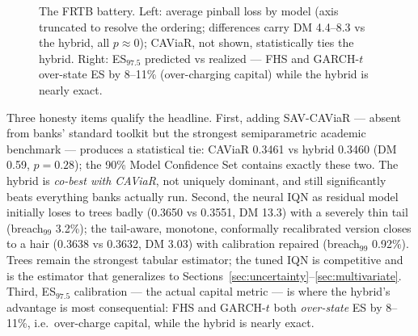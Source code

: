 \documentclass[11pt]{article}
\theoremstyle{remark}
\begin{document}
\begin{figure}[t]
\centering
{}\hfill
{}
\caption{The FRTB battery. Left: average pinball loss by model (axis
truncated to resolve the ordering; differences carry DM 4.4--8.3 vs the
hybrid, all $p \approx 0$); CAViaR, not shown, statistically ties the
hybrid. Right: ES$_{97.5}$ predicted vs realized --- FHS and GARCH-$t$
over-state ES by 8--11\% (over-charging capital) while the hybrid is
nearly exact.}
\label{fig:frtb}
\end{figure}

Three honesty items qualify the headline. First, adding SAV-CAViaR ---
absent from banks' standard toolkit but the strongest semiparametric
academic benchmark --- produces a statistical tie: CAViaR 0.3461 vs
hybrid 0.3460 (DM 0.59, $p=0.28$); the 90\% Model Confidence Set
contains exactly these two. The hybrid is \emph{co-best with CAViaR},
not uniquely dominant, and still significantly beats everything banks
actually run. Second, the neural IQN as residual model initially loses
to trees badly (0.3650 vs 0.3551, DM 13.3) with a severely thin tail
(breach$_{99}$ 3.2\%); the tail-aware, monotone, conformally
recalibrated version closes to a hair (0.3638 vs 0.3632, DM 3.03) with
calibration repaired (breach$_{99}$ 0.92\%). Trees remain the strongest
tabular estimator; the tuned IQN is competitive and is the estimator
that generalizes to Sections~\ref{sec:uncertainty}--\ref{sec:multivariate}.
Third, ES$_{97.5}$ calibration --- the actual capital metric --- is
where the hybrid's advantage is most consequential: FHS and GARCH-$t$
both \emph{over-state} ES by 8--11\%, i.e.\ over-charge capital, while
the hybrid is nearly exact.
\end{document}
